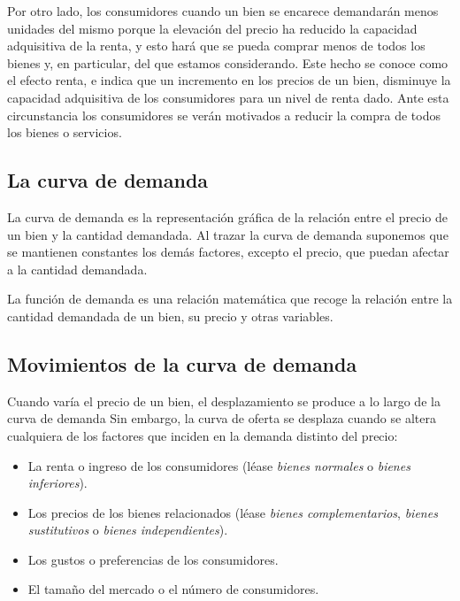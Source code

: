 \documentclass[
]{krantz}
\providecommand{\tightlist}{%
  \setlength{\itemsep}{0pt}\setlength{\parskip}{0pt}}
\begin{document}
Por otro lado, los consumidores cuando un bien se encarece demandarán menos unidades del mismo porque la elevación del precio ha reducido la capacidad adquisitiva de la renta, y esto hará que se pueda comprar menos de todos los bienes y, en particular, del que estamos considerando. Este hecho se conoce como el efecto renta, e indica que un incremento en los precios de un bien, disminuye la capacidad adquisitiva de los consumidores para un nivel de renta dado. Ante esta circunstancia los consumidores se verán motivados a reducir la compra de todos los bienes o servicios.

\hypertarget{la-curva-de-demanda}{%
\subsection{La curva de demanda}\label{la-curva-de-demanda}}

La curva de demanda es la representación gráfica de la relación entre el precio de un bien y la cantidad demandada. Al trazar la curva de demanda suponemos que se mantienen constantes los demás factores, excepto el precio, que puedan afectar a la cantidad demandada.

La función de demanda es una relación matemática que recoge la relación entre la cantidad demandada de un bien, su precio y otras variables.

\hypertarget{movimientos-de-la-curva-de-demanda}{%
\subsection{Movimientos de la curva de demanda}\label{movimientos-de-la-curva-de-demanda}}

Cuando varía el precio de un bien, el desplazamiento se produce a lo largo de la curva de demanda Sin embargo, la curva de oferta se desplaza cuando se altera cualquiera de los factores que inciden en la demanda distinto del precio:

\begin{itemize}
\tightlist
\item
  La renta o ingreso de los consumidores (léase \emph{bienes normales} o \emph{bienes inferiores}).
\item
  Los precios de los bienes relacionados (léase \emph{bienes complementarios}, \emph{bienes sustitutivos} o \emph{bienes independientes}).
\item
  Los gustos o preferencias de los consumidores.
\item
  El tamaño del mercado o el número de consumidores.
\end{itemize}
\end{document}
